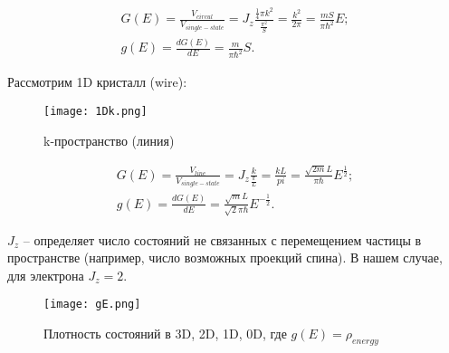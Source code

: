 \begin{gather*} 
	G(E) = \frac{V_{circul}}{V_{single-state}} = J_{z}\frac{\frac{1}{4}\pi k^{2}}{\frac{\pi^2}{S}} = \frac{k^{2}}{2\pi} = \frac{mS}{\pi\hbar^{2}}E;\\
	g(E) = \frac{dG(E)}{dE} = \frac{m}{\pi\hbar^{2}}S.
\end{gather*}

Рассмотрим 1D кристалл (wire):
\begin{figure}[h]
	\centering
	\texttt{[image: 1Dk.png]}
	\caption{k-пространство (линия)}
	\label{1Dk}
\end{figure}
\begin{gather*} 
	G(E) = \frac{V_{line}}{V_{single-state}} = J_{z}\frac{k}{\frac{\pi}{L}} = \frac{kL}{pi} = \frac{\sqrt{2m}L}{\pi\hbar}E^{\frac{1}{2}};\\
	g(E) = \frac{dG(E)}{dE} = \frac{\sqrt{m}L}{\sqrt{2}\pi\hbar}E^{-\frac{1}{2}}.
\end{gather*}

$J_{z}$ -- определяет число состояний не связанных с перемещением частицы в пространстве (например, число возможных проекций спина). В нашем случае, для электрона $J_{z}=2$.

\begin{figure}[h]
	\centering
	\texttt{[image: gE.png]}
	\caption{Плотность состояний в 3D, 2D, 1D, 0D, где $g(E) = \rho_{energy}$}
	\label{DOS}
\end{figure}





